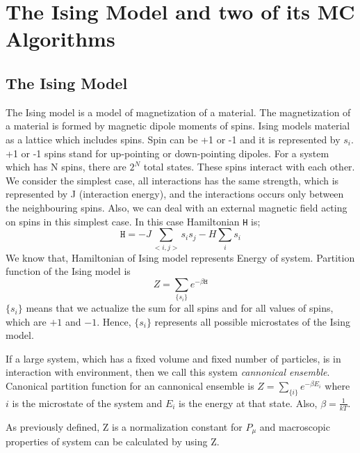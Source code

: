 \documentclass[12pt,fleqn]{report}
\begin{document}
\chapter{The Ising Model and two of its MC Algorithms}

\section{The Ising Model}

The Ising model is a model of magnetization of a material. The magnetization of a material is formed by magnetic dipole moments of spins. Ising models material as a lattice which includes spins. Spin can be +1 or -1 and it is represented by $s_i$. +1 or -1 spins stand for up-pointing or down-pointing dipoles. For a system which has N spins, there are $2^N$ total states. These spins interact with each other. We consider the simplest case, all interactions has the same strength, which is represented by J (interaction energy), and the interactions occurs only between the neighbouring spins. Also, we can deal with an external magnetic field acting on spins in this simplest case.
In this case Hamiltonian \texttt{H} is; 
\begin{equation}
\texttt{H} = - J \sum\limits_{<i,j>} s_i s_j - H\sum\limits_{i} s_i
\end{equation}
We know that, Hamiltonian of Ising model represents Energy of system.
Partition function of the Ising model is 
\begin{equation}
Z = \sum\limits_{\{s_i\}} e^{-\beta \texttt{H}}
\end{equation}
$\{s_i\}$ means that we actualize the sum for all spins and for all values of spins, which are $+1$ and $-1$. Hence, $\{s_i\}$ represents all possible microstates of the Ising model.

If a large system, which has a fixed volume and fixed number of particles, is in interaction with environment, then we call this system \textit{cannonical ensemble}. Canonical partition function for an cannonical ensemble is $ Z = \sum\limits_{\{i\}} e^{-\beta E_i} $ where $i$ is the microstate of the system and $E_i$ is the energy at that state. Also, $    \beta = \frac{1}{kT}$. 

As previously defined, Z is a normalization constant for $P_\mu$ and macroscopic properties of system can be calculated by using Z.
\end{document}
